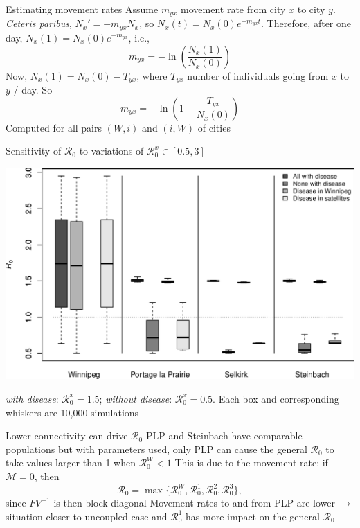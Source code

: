\documentclass[aspectratio=169]{beamer}\usepackage[]{graphicx}\usepackage[]{xcolor}
\begin{document}
\begin{frame}{Estimating movement rates}
	Assume $m_{yx}$ movement rate from city $x$ to city $y$. \emph{Ceteris paribus}, $N_x'=-m_{yx}N_x$, so $N_x(t)=N_x(0)e^{-m_{yx}t}$. Therefore, after one day, $N_x(1)=N_x(0)e^{-m_{yx}}$, i.e.,
	$$
	m_{yx}=-\ln\left(\frac{N_x(1)}{N_x(0)}\right)
	$$
	Now, $N_x(1)=N_x(0)-T_{yx}$, where $T_{yx}$ number of individuals going from $x$ to $y$ / day. So
	$$
	m_{yx}=-\ln\left(1-\frac{T_{yx}}{N_x(0)}\right)
	$$
	Computed for all pairs $(W,i)$ and $(i,W)$ of cities
\end{frame}
	
\begin{frame}{Sensitivity of $\mathcal{R}_0$ to variations of $\mathcal{R}_0^x\in[0.5,3]$}
\begin{center}
	\includegraphics[width=\textwidth]{FIGS/sensitivity_4cities}
\end{center}
\emph{with disease}: $\mathcal{R}_0^x=1.5$; \emph{without disease}: $\mathcal{R}_0^x=0.5$. Each box and corresponding whiskers are 10,000 simulations
\end{frame}

\begin{frame}{Lower connectivity can drive $\mathcal{R}_0$}
	PLP and Steinbach have comparable populations but with parameters used, only PLP can cause the general $\mathcal{R}_0$ to take values larger than 1 when $\mathcal{R}_0^W<1$
	\vfill
	This is due to the movement rate: if $\mathcal{M}=0$, then
	$$
	\mathcal{R}_0=\max\{\mathcal{R}_0^W,\mathcal{R}_0^1,\mathcal{R}_0^2,\mathcal{R}_0^3\},
	$$
	since $FV^{-1}$ is then block diagonal
	\vfill
	Movement rates to and from PLP are lower $\rightarrow$ situation closer to uncoupled case and $\mathcal{R}_0^1$ has more impact on the general $\mathcal{R}_0$
\end{frame}
\end{document}
